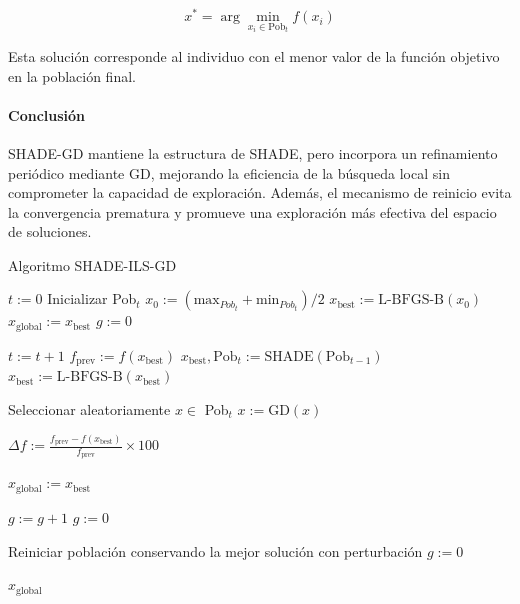 \begin{equation*}
    x^* = \arg\min_{x_i \in \text{Pob}_t} f(x_i)
\end{equation*}

Esta solución corresponde al individuo con el menor valor de la función objetivo en la población final.

\paragraph{Conclusión\\}

SHADE-GD mantiene la estructura de SHADE, pero incorpora un refinamiento periódico mediante GD, mejorando la eficiencia de la búsqueda local sin comprometer la capacidad de exploración. Además, el mecanismo de reinicio evita la convergencia prematura y promueve una exploración más efectiva del espacio de soluciones.





\begin{algorithm}
\caption{Algoritmo SHADE-ILS-GD}
\label{alg:shade-ils-gd}
	\begin{algorithmic}
		\State $t := 0$
		\State Inicializar Pob$_t$
		\State $x_0 := (\text{max}_{Pob_t} + \text{min}_{Pob_t})/2$
		\State $x_{\text{best}} := \text{L-BFGS-B}(x_0)$
		\State $x_{\text{global}} := x_{\text{best}}$
		\State $g := 0$ 
		
			\State $t := t+1$
			\State $f_{\text{prev}} := f(x_{\text{best}})$
			\State $x_{\text{best}}, \text{Pob}_t := \text{SHADE}(\text{Pob}_{t-1})$
			\State $x_{\text{best}} := \text{L-BFGS-B}(x_{\text{best}})$
			
				\State Seleccionar aleatoriamente $x \in$ Pob$_t$
				\State $x := \text{GD}(x)$
			\EndIf
			
			\State $\Delta f := \frac{f_{\text{prev}} - f(x_{\text{best}})}{f_{\text{prev}}} \times 100$
			
				\State $x_{\text{global}} := x_{\text{best}}$
			\EndIf
			
				\State $g := g + 1$
			\Else
				\State $g := 0$
			\EndIf
			
				\State Reiniciar población conservando la mejor solución con perturbación
				\State $g := 0$
			\EndIf		
		\EndWhile
		
		\Return $x_{\text{global}}$
	\end{algorithmic}
\end{algorithm}



